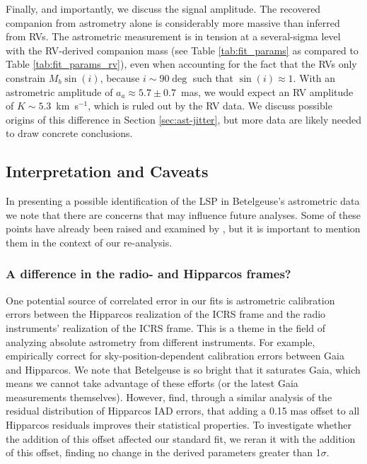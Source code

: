 \documentclass[twocolumn]{aastex631}
\begin{document}
Finally, and importantly, we discuss the signal amplitude. The recovered companion  from  astrometry alone is considerably more massive than inferred from RVs. The astrometric  measurement is in tension at a several-sigma level with the RV-derived companion mass (see Table \ref{tab:fit_params} as compared to Table \ref{tab:fit_params_rv}), even when accounting for the fact that the RVs only constrain $M_b \sin(i)$, because $i\sim 90 \deg$ such that $\sin(i)\approx 1$. 
 With an astrometric amplitude of $a_a \approx 5.7 \pm 0.7$~mas, we would expect an RV amplitude of $K\sim 5.3$~km~s$^{-1}$, which is ruled out by the RV data.  We discuss possible origins of this difference  in Section \ref{sec:ast-jitter}, but more data are likely needed to draw concrete conclusions.




\subsection{Interpretation and Caveats}

In presenting a possible identification of the LSP in Betelgeuse's astrometric data we note that there are concerns that may influence future analyses. Some of these points have already been raised and examined by \citet{2017AJ....154...11H}, but it is important to mention them in the context of our re-analysis. 

\subsubsection{A difference in the radio- and Hipparcos frames?}

One potential source of correlated error in our fits is astrometric calibration errors between the Hipparcos realization of the ICRS frame and the radio instruments' realization of the ICRS frame. This is a theme in the field of analyzing absolute astrometry from different instruments. For example, \citet{Brandt:2021a}  empirically correct for sky-position-dependent calibration errors between Gaia and Hipparcos. We note that Betelgeuse is so bright that it saturates Gaia, which means we cannot take advantage of these efforts (or the latest Gaia measurements themselves). However, \citet{Brandt:2023a} find, through a similar analysis of the residual distribution of Hipparcos IAD errors, that adding a 0.15 mas offset to all Hipparcos residuals improves their statistical properties. To investigate whether the addition of this offset affected our standard fit, we reran it with the addition of this offset, finding no change in the derived parameters greater than 1$\sigma$. 
\end{document}

